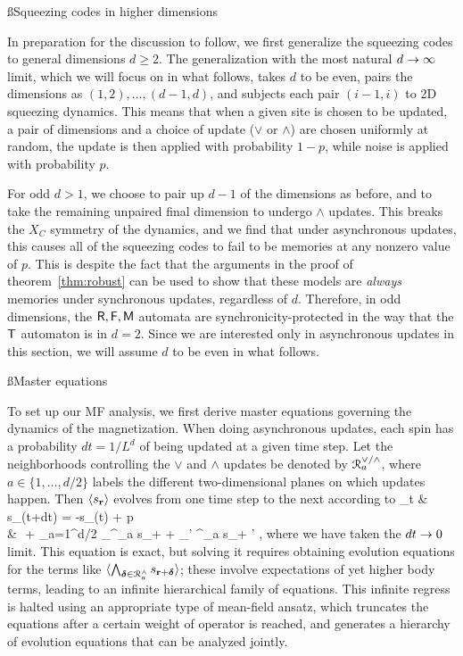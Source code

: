 \documentclass[pra,aps,twocolumn,groupedaddress,superscriptaddress,nofootinbib,preprintnumbers]{revtex4-2}
\begin{document}
	\ss{Squeezing codes in higher dimensions}
	
	In preparation for the discussion to follow, we first generalize the squeezing codes to general dimensions $d\geq2$. The generalization with the most natural $d\rightarrow\infty$ limit, which we will focus on in what follows, 
	takes $d$ to be even, pairs the dimensions as $(1,2), \dots, (d-1,d)$, and subjects each pair $(i-1,i)$ to 2D squeezing dynamics. 
	This means that when a given site is chosen to be updated, a pair of dimensions and a choice of update ($\vee$ or $\wedge$) are chosen uniformly at random, the update is then applied with probability $1-p$, while noise is applied with probability $p$. 
	
	For odd $d>1$, we choose to pair up $d-1$ of the dimensions as before, and to take the remaining unpaired final dimension to undergo $\wedge$ updates. This breaks the $X_C$ symmetry of the dynamics, and we find that under asynchronous updates, this causes all of the squeezing codes to fail to be memories at any nonzero value of $p$. This is despite the fact that the arguments in the proof of theorem~\ref{thm:robust} can be used to show that these models are {\it always} memories under synchronous updates, regardless of $d$. Therefore, in odd dimensions, the $\mathsf{R},\mathsf{F},\mathsf{M}$ automata are synchronicity-protected in the way that the $\mathsf{T}$ automaton is in $d=2$. Since we are interested only in asynchronous updates in this section, we will assume $d$ to be even in what follows. 
	
	\ss{Master equations}
	
	To set up our MF analysis, we first derive master equations governing the dynamics of the magnetization. 
	When doing asynchronous updates, each spin has a probability $dt = 1/L^d$ of being updated at a given time step. Let the neighborhoods controlling the $\vee$ and $\wedge$ updates be denoted by $\mathcal{R}^{\vee/\wedge}_a$, where $a \in \{1,\dots,d/2\}$ labels the different two-dimensional planes on which updates happen. Then $\langle s_{\mathbf{r}}\rangle$ evolves from one time step to the next according to 
	\bea \label{master} \p_t \lan & s_\bfr(t+dt) \ran  = -\lan s_\bfr(t) \ran + \eta p \\ & \,\,+  \sum_{a=1}^{d/2} \left\lan \bigwedge_{\bfdel \in \mcr^\wedge_a} s_{\bfr+\bfdel} + \bigvee_{\bfdel' \in \mcr^\vee_a} s_{\bfr + \bfdel'} \right\ran,\eea 
	where we have taken the $dt\rightarrow0$ limit. 
	This equation is exact, but solving it requires obtaining evolution equations for the terms like $\langle \bigwedge_{{\boldsymbol{\delta}}\in \mathcal{R}^\wedge_a} s_{\mathbf{r}+{\boldsymbol{\delta}}} \rangle$; these involve expectations of yet higher body terms, leading to an infinite hierarchical family of equations. This infinite regress is halted using an appropriate type of mean-field ansatz, which truncates the equations after a certain weight of operator is reached, and generates a hierarchy of evolution equations that can be analyzed jointly. %
	
\end{document}
